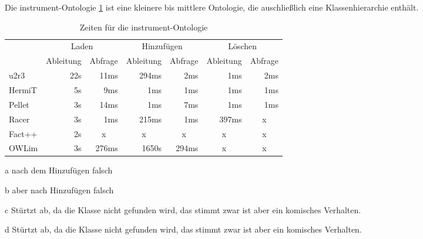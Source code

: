 Die instrument-Ontologie \ref{table-time-instrument} ist eine kleinere bis mittlere Ontologie, die auschließlich eine Klassenhierarchie enthält.

\begin{table}[htbp]
\caption{Zeiten für die instrument-Ontologie}
\label{table-time-instrument}
\begin{center}
\begin{threeparttable}
\begin{tabular}{l|r|r|r|r|r|r|}
\cline{2-7}
 & \multicolumn{2}{|c|}{Laden} & \multicolumn{2}{|c|}{Hinzufügen} & \multicolumn{2}{|c|}{Löschen} \\
\cline{2-7}
 & \multicolumn{1}{|c|}{Ableitung} & \multicolumn{1}{|c|}{Abfrage} & \multicolumn{1}{|c|}{Ableitung} & \multicolumn{1}{|c|}{Abfrage} & \multicolumn{1}{|c|}{Ableitung} & \multicolumn{1}{|c|}{Abfrage} \\
\hline
\multicolumn{1}{|l|}{u2r3} & 22s & 11ms & 294ms & 2ms & 1ms & 2ms \\ \hline
\multicolumn{1}{|l|}{HermiT\tnote{a}} & 5s & 9ms & 1ms & 1ms & 1ms & 1ms \\ \hline
\multicolumn{1}{|l|}{Pellet\tnote{b}} & 3s & 14ms & 1ms & 7ms & 1ms & 1ms \\ \hline
\multicolumn{1}{|l|}{Racer\tnote{c}} & 3s & 1ms & 215ms & 1ms & 397ms & \multicolumn{1}{c|}{x} \\ \hline
\multicolumn{1}{|l|}{Fact++\tnote{d}} & 2s & \multicolumn{1}{c|}{x} & \multicolumn{1}{c|}{x} & \multicolumn{1}{c|}{x} & \multicolumn{1}{c|}{x} & \multicolumn{1}{c|}{x} \\ \hline
\multicolumn{1}{|l|}{OWLim} & 3s & 276ms & 1650s & 294ms & \multicolumn{1}{c|}{x} & \multicolumn{1}{c|}{x} \\ \hline
\end{tabular}
\begin{tablenotes}
	\item[a] nach dem Hinzufügen falsch
	\item[b] aber nach Hinzufügen falsch
	\item[c] Stürtzt ab, da die Klasse nicht gefunden wird, das stimmt zwar ist aber ein komisches Verhalten.
	\item[d] Stürtzt ab, da die Klasse nicht gefunden wird, das stimmt zwar ist aber ein komisches Verhalten.
\end{tablenotes}
\end{threeparttable}
\end{center}
\end{table}


